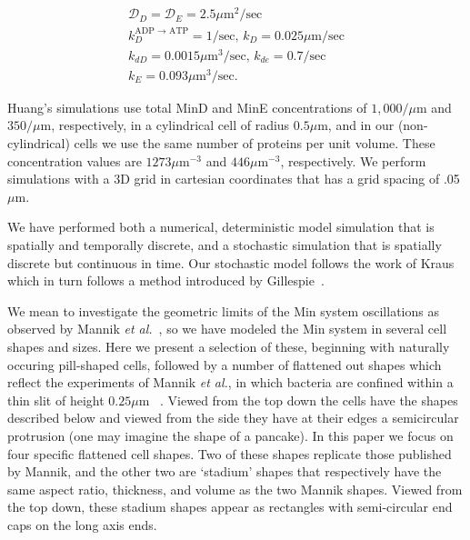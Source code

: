 \documentclass{pnastwo}
\newcommand\micron{\ensuremath{\mu\text{m}}}
\begin{document}
\begin{article}
\begin{gather*}
  \mathcal{D}_D = \mathcal{D}_{E} = 2.5\micron^2/\text{sec}\\
  k_D^{\textrm{ADP $\rightarrow$ ATP}} = 1/\textrm{sec,  }
  k_D = 0.025 \micron /\textrm{sec}\\
  k_{dD} = 0.0015 \micron^3/ \textrm{sec,  }
  k_{de} = 0.7/\textrm{sec}\\
  k_E = 0.093 \micron^3 /\textrm{sec}.
\end{gather*}

Huang's simulations use total MinD and MinE concentrations of
$1,000/\micron$ and $350/\micron$, respectively, in a cylindrical cell
of radius $0.5\micron$, and in our (non-cylindrical) cells we use the
same number of proteins per unit volume.  These concentration values
are $1273\micron^{-3}$ and $446\micron^{-3}$, respectively. We perform
simulations with a 3D grid in cartesian coordinates that has a grid
spacing of .05\micron.

We have performed both a numerical, deterministic model simulation
that is spatially and temporally discrete, and a stochastic simulation
that is spatially discrete but continuous in time.  Our stochastic
model follows the work of Kraus~\cite{kraus1996crosstalk} which in
turn follows a method introduced by
Gillespie~\cite{gillespie1977exact}.

We mean to investigate the geometric limits of the Min system
oscillations as observed by Mannik \emph{et
  al.}~\cite{mannik2012robustness}, so we have modeled the Min system
in several cell shapes and sizes.  Here we present a selection of
these, beginning with naturally occuring pill-shaped cells, followed
by a number of flattened out shapes which reflect the experiments of
Mannik \emph{et al.}, in which bacteria are confined within a thin
slit of height $0.25\micron$ ~\cite{mannik2012robustness}.  Viewed
from the top down the cells have the shapes described below and viewed
from the side they have at their edges a semicircular protrusion (one
may imagine the shape of a pancake).
%
In this paper we focus on four specific flattened cell shapes.  Two of
these shapes replicate those published by Mannik, and the other two
are `stadium' shapes that respectively have the same aspect ratio,
thickness, and volume as the two Mannik shapes.  Viewed from the top
down, these stadium shapes appear as rectangles with semi-circular end
caps on the long axis ends.


\end{article}
\end{document}
